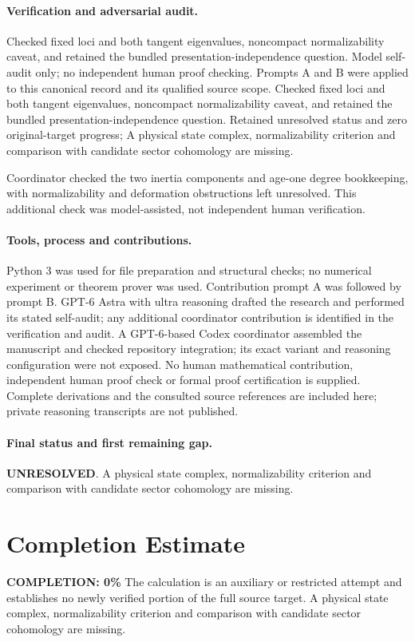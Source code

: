 \documentclass[11pt]{article}
\begin{document}
\paragraph{Verification and adversarial audit.}
Checked fixed loci and both tangent eigenvalues, noncompact normalizability caveat, and retained the bundled presentation-independence question. Model self-audit only; no independent human proof checking. Prompts A and B were applied to this canonical record and its qualified source scope. Checked fixed loci and both tangent eigenvalues, noncompact normalizability caveat, and retained the bundled presentation-independence question. Retained unresolved status and zero original-target progress; A physical state complex, normalizability criterion and comparison with candidate sector cohomology are missing.

Coordinator checked the two inertia components and age-one degree bookkeeping, with normalizability and deformation obstructions left unresolved. This additional check was model-assisted, not independent human verification.

\paragraph{Tools, process and contributions.}
Python 3 was used for file preparation and structural checks; no numerical experiment or theorem prover was used. Contribution prompt A was followed by prompt B. GPT-6 Astra with ultra reasoning drafted the research and performed its stated self-audit; any additional coordinator contribution is identified in the verification and audit. A GPT-6-based Codex coordinator assembled the manuscript and checked repository integration; its exact variant and reasoning configuration were not exposed. No human mathematical contribution, independent human proof check or formal proof certification is supplied. Complete derivations and the consulted source references are included here; private reasoning transcripts are not published.

\paragraph{Final status and first remaining gap.}
\textbf{UNRESOLVED}. A physical state complex, normalizability criterion and comparison with candidate sector cohomology are missing.

\section{Completion Estimate}
\noindent\textbf{COMPLETION: 0\%}
The calculation is an auxiliary or restricted attempt and establishes no newly verified portion of the full source target. A physical state complex, normalizability criterion and comparison with candidate sector cohomology are missing.
\end{document}
